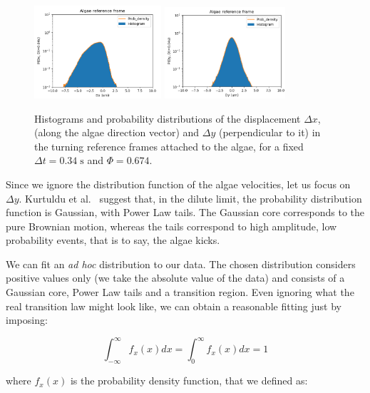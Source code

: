 \begin{figure}[H]
	\centering
	\includegraphics[width=0.42\textwidth]{archivos/pdf_x_e3_longer.png}
	\includegraphics[width=0.4\textwidth]{archivos/pdf_y_e3_longer.png}
	\caption{Histograms and probability distributions of the displacement $\Delta x$, (along the algae direction vector) and $\Delta y$ (perpendicular to it) in the turning reference frames attached to the algae, for a fixed $\Delta t = 0.34 \; \textrm{s}$ and $\Phi = 0.674$.}
	\label{prob_dist_e3_longer}
\end{figure}

Since we ignore the distribution function of the algae velocities, let us focus on $\Delta y$. Kurtuldu et al.~\cite{Kurtuldu2011} suggest that, in the dilute limit, the probability distribution function is Gaussian, with Power Law tails. The Gaussian core corresponds to the pure Brownian motion, whereas the tails correspond to high amplitude, low probability events, that is to say, the algae kicks. 

We can fit an \textit{ad hoc} distribution to our data. The chosen distribution considers positive values only (we take the absolute value of the data) and consists of a Gaussian core, Power Law tails and a transition region. Even ignoring what the real transition law might look like, we can obtain a reasonable fitting just by imposing:

\begin{equation}
\int_{-\infty}^{\infty} f_x(x) dx = \int_{0}^{\infty} f_x(x) dx = 1
\label{probarea}
\end{equation}

where $f_x(x)$ is the probability density function, that we defined as: 

